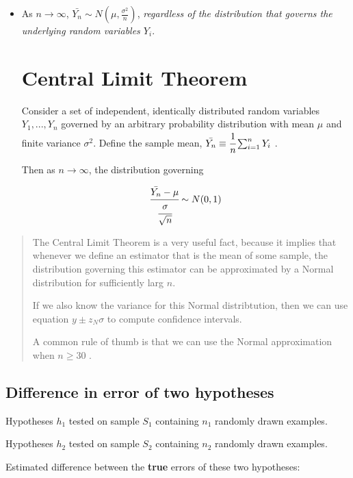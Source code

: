 \begin{itemize}
\item
  As \(n\rightarrow \infty\),
  \(\bar{Y_n}\sim N(\mu,\frac{\sigma^2}{n})\), \emph{regardless of the
  distribution that governs the underlying random variables \(Y_i\)}.

  \hypertarget{central-limit-theorem-2}{%
  \section{Central Limit Theorem}\label{central-limit-theorem-2}}

  Consider a set of independent, identically distributed random
  variables \(Y_1,...,Y_n\) governed by an arbitrary probability
  distribution with mean \(\mu\) and finite variance \(\sigma^2\).
  Define the sample mean, \(\bar{Y_n}\equiv\cfrac{1}{n}\sum^n_{i=1}Y_i\)
  .

  Then as \(n\rightarrow \infty\), the distribution governing

  \[\cfrac{\bar{Y_n}-\mu}{\cfrac{\sigma}{\sqrt{n}}}\sim N(0,1)\]
\end{itemize}

\begin{quote}
The Central Limit Theorem is a very useful fact, because it implies that
whenever we define an estimator that is the mean of some sample, the
distribution governing this estimator can be approximated by a Normal
distribution for sufficiently larg \(n\).

If we also know the variance for this Normal distribtution, then we can
use equation \(y\pm z_N\sigma\) to compute confidence intervals.

A common rule of thumb is that we can use the Normal approximation when
\(n\ge30\) .
\end{quote}

\hypertarget{difference-in-error-of-two-hypotheses}{%
\subsection{Difference in error of two
hypotheses}\label{difference-in-error-of-two-hypotheses}}

Hypotheses \(h_1\) tested on sample \(S_1\) containing \(n_1\) randomly
drawn examples.

Hypotheses \(h_2\) tested on sample \(S_2\) containing \(n_2\) randomly
drawn examples.

Estimated difference between the \textbf{true} errors of these two
hypotheses:

